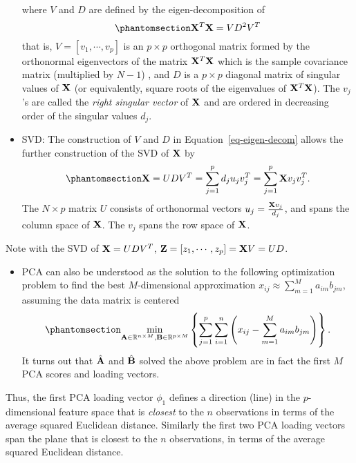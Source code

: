 \documentclass[
  letterpaper,
  DIV=11,
  numbers=noendperiod]{scrreprt}
\providecommand{\tightlist}{%
  \setlength{\itemsep}{0pt}\setlength{\parskip}{0pt}}\usepackage{longtable,booktabs,array}
\begin{document}
\begin{itemize}
\[  \] where \(V\) and \(D\) are defined by the eigen-decomposition of
  \begin{equation}\phantomsection\label{eq-eigen-decom}{
  {\bf X}^T{\bf X}=VD^2V^T
  }\end{equation} that is, \(V=[v_1, \cdots, v_p]\) is an \(p\times p\)
  orthogonal matrix formed by the orthonormal eigenvectors of the matrix
  \({\bf X}^T{\bf X}\) which is the sample covariance matrix (multiplied
  by \(N-1\)) , and \(D\) is a \(p\times p\) diagonal matrix of singular
  values of \({\bf X}\) (or equivalently, square roots of the
  eigenvalues of \({\bf X}^T{\bf X}\)). The \(v_j\)'s are called the
  \emph{right singular vector} of \({\bf X}\) and are ordered in
  decreasing order of the singular values \(d_j\).
\item
  SVD: The construction of \(V\) and \(D\) in
  Equation~\ref{eq-eigen-decom} allows the further construction of the
  SVD of \({\bf X}\) by
  \begin{equation}\phantomsection\label{eq-svd}{{\bf X}=UDV^T =\sum_{j=1}^p d_ju_jv_j^T = \sum_{j=1}^p {\bf X}v_jv_j^T. }\end{equation}
  The \(N\times p\) matrix \(U\) consists of orthonormal vectors
  \(u_j=\frac{{\bf X}v_j}{d_j}\), and spans the column space of
  \({\bf X}\). The \(v_j\) spans the row space of \({\bf X}\).
\end{itemize}

Note with the SVD of \({\bf X}=UDV^T\),
\({\bf Z}= [z_1, \cdots, z_p]={\bf X}V=UD\).

\begin{itemize}
\tightlist
\item
  PCA can also be understood as the solution to the following
  optimization problem to find the best \(M\)-dimensional approximation
  \(x_{ij}\approx \sum_{m=1}^M a_{im} b_{jm}\), assuming the data matrix
  is centered \begin{equation}\phantomsection\label{eq-pca-approx}{
  \min_{{\bf A}\in \mathbb{R}^{n\times M}, {\bf B}\in \mathbb{R}^{p\times M}} \left\{ \sum_{j=1}^p\sum_{i=1}^n \left(x_{ij} - \sum_{m=1}^M a_{im} b_{jm}   \right) \right\}.
  }\end{equation} It turns out that \(\hat{\bf A}\) and \(\hat{\bf B}\)
  solved the above problem are in fact the first \(M\) PCA scores and
  loading vectors.
\end{itemize}

Thus, the first PCA loading vector \(\phi_1\) defines a direction (line)
in the \(p\)-dimensional feature space that is \emph{closest} to the
\(n\) observations in terms of the average squared Euclidean distance.
Similarly the first two PCA loading vectors span the plane that is
closest to the \(n\) observations, in terms of the average squared
Euclidean distance.
\end{document}
